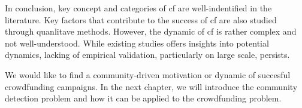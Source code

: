 In conclusion, key concept and categories of \acrshort{cf} are well-indentified in the literature.
Key factors that contribute to the success of \acrshort{cf} are also studied through quanlitave methods.
However, the dynamic of \acrshort{cf} is rather complex and not well-understood.
While existing studies offers insights into potential dynamics, lacking of empirical validation, particularly on large scale, persists.

We would like to find a community-driven motivation or dynamic of succesful crowdfunding campaigns.
In the next chapter, we will introduce the community detection problem and how it can be applied to the crowdfunding problem.

